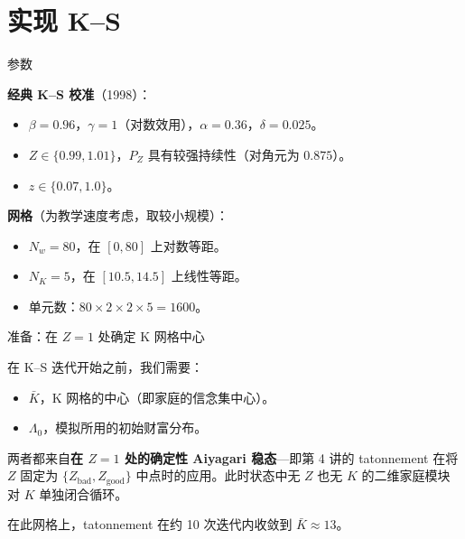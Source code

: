 \documentclass[10pt,aspectratio=169]{beamer}
\begin{document}
\section[实现 K--S]{实现 K--S}

\begin{frame}{参数}

\textbf{经典 K--S 校准}（1998）：

\begin{itemize}
  \item $\beta = 0.96$，$\gamma = 1$（对数效用），$\alpha = 0.36$，$\delta = 0.025$。
  \item $Z \in \{0.99, 1.01\}$，$P_Z$ 具有较强持续性（对角元为 $0.875$）。
  \item $z \in \{0.07, 1.0\}$。
\end{itemize}

\smallskip

\textbf{网格}（为教学速度考虑，取较小规模）：

\begin{itemize}
  \item $N_w = 80$，在 $[0, 80]$ 上对数等距。
  \item $N_K = 5$，在 $[10.5, 14.5]$ 上线性等距。
  \item 单元数：$80 \times 2 \times 2 \times 5 = 1600$。
\end{itemize}

\end{frame}

\begin{frame}{准备：在 $Z = 1$ 处确定 K 网格中心}

在 K--S 迭代开始之前，我们需要：

\begin{itemize}
  \item $\bar K$，K 网格的中心（即家庭的信念集中心）。
  \item $\Lambda_0$，模拟所用的初始财富分布。
\end{itemize}

\smallskip

两者都来自\textbf{在 $Z = 1$ 处的确定性 Aiyagari 稳态}---即第 4 讲的 tatonnement 在将 $Z$ 固定为 $\{Z_{\text{bad}}, Z_{\text{good}}\}$ 中点时的应用。此时状态中无 $Z$ 也无 $K$ 的二维家庭模块对 $K$ 单独闭合循环。

\smallskip

在此网格上，tatonnement 在约 10 次迭代内收敛到 $\bar K \approx 13$。

\end{frame}
\end{document}
